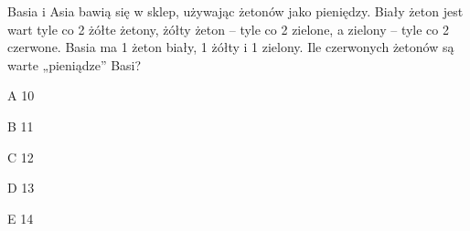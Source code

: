 \begin{tresc}
Basia i Asia bawią się w sklep, używając żetonów jako pieniędzy. Biały żeton jest wart tyle co 2 żółte żetony, żółty żeton – tyle co 2 zielone, a zielony – tyle co 2 czerwone. Basia ma 1 żeton biały, 1 żółty i 1 zielony. Ile czerwonych żetonów są warte „pieniądze” Basi?
\end{tresc}
\begin{wariant}{A} 10 \end{wariant}
\begin{wariant}{B} 11 \end{wariant}
\begin{wariant}{C} 12 \end{wariant}
\begin{wariant}{D} 13 \end{wariant}
\begin{wariant}{E} 14 \end{wariant}

